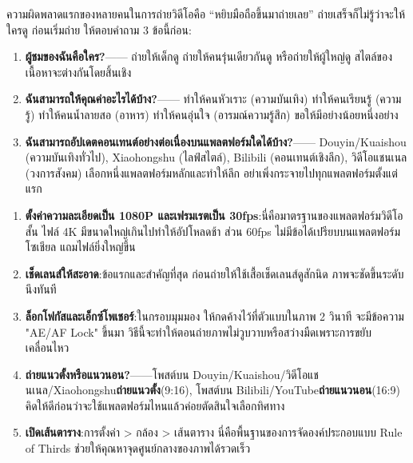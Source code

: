 


ความผิดพลาดแรกของหลายคนในการถ่ายวิดีโอคือ “หยิบมือถือขึ้นมาถ่ายเลย” ถ่ายเสร็จก็ไม่รู้ว่าจะให้ใครดู ก่อนเริ่มถ่าย ให้ตอบคำถาม 3 ข้อนี้ก่อน:

\begin{enumerate}
  \item \textbf{ผู้ชมของฉันคือใคร?}—— ถ่ายให้เด็กดู ถ่ายให้คนรุ่นเดียวกันดู หรือถ่ายให้ผู้ใหญ่ดู สไตล์ของเนื้อหาจะต่างกันโดยสิ้นเชิง
  \item \textbf{ฉันสามารถให้คุณค่าอะไรได้บ้าง?}—— ทำให้คนหัวเราะ (ความบันเทิง) ทำให้คนเรียนรู้ (ความรู้) ทำให้คนน้ำลายสอ (อาหาร) ทำให้คนอุ่นใจ (อารมณ์ความรู้สึก) ขอให้มีอย่างน้อยหนึ่งอย่าง
  \item \textbf{ฉันสามารถอัปเดตคอนเทนต์อย่างต่อเนื่องบนแพลตฟอร์มใดได้บ้าง?}—— Douyin/Kuaishou (ความบันเทิงทั่วไป), Xiaohongshu (ไลฟ์สไตล์), Bilibili (คอนเทนต์เชิงลึก), วิดีโอแชนเนล (วงการสังคม) เลือกหนึ่งแพลตฟอร์มหลักและทำให้ลึก อย่าเพิ่งกระจายไปทุกแพลตฟอร์มตั้งแต่แรก
\end{enumerate}


\begin{enumerate}
  \item \textbf{ตั้งค่าความละเอียดเป็น 1080P และเฟรมเรตเป็น 30fps}:นี่คือมาตรฐานของแพลตฟอร์มวิดีโอสั้น ไฟล์ 4K มีขนาดใหญ่เกินไปทำให้อัปโหลดช้า ส่วน 60fps ไม่มีข้อได้เปรียบบนแพลตฟอร์มโซเชียล แถมไฟล์ยิ่งใหญ่ขึ้น
  \item \textbf{เช็ดเลนส์ให้สะอาด}:ข้อแรกและสำคัญที่สุด ก่อนถ่ายให้ใช้เสื้อเช็ดเลนส์ดูสักนิด ภาพจะชัดขึ้นระดับนึงทันที
  \item \textbf{ล็อกโฟกัสและเอ็กซ์โพเชอร์}:ในกรอบมุมมอง ให้กดค้างไว้ที่ตัวแบบในภาพ 2 วินาที จะมีข้อความ "AE/AF Lock" ขึ้นมา วิธีนี้จะทำให้ตอนถ่ายภาพไม่วูบวาบหรือสว่างมืดเพราะการขยับเคลื่อนไหว
  \item \textbf{ถ่ายแนวตั้งหรือแนวนอน?}——โพสต์บน Douyin/Kuaishou/วิดีโอแชนเนล/Xiaohongshu\textbf{ถ่ายแนวตั้ง}(9:16), โพสต์บน Bilibili/YouTube\textbf{ถ่ายแนวนอน}(16:9) คิดให้ดีก่อนว่าจะใช้แพลตฟอร์มไหนแล้วค่อยตัดสินใจเลือกทิศทาง
  \item \textbf{เปิดเส้นตาราง}:การตั้งค่า > กล้อง > เส้นตาราง นี่คือพื้นฐานของการจัดองค์ประกอบแบบ Rule of Thirds ช่วยให้คุณหาจุดศูนย์กลางของภาพได้รวดเร็ว
\end{enumerate}

